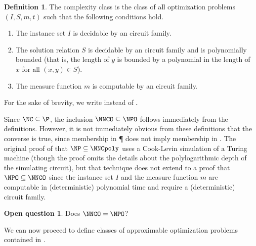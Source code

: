 \documentclass[]{article}
\theoremstyle{definition} \newtheorem{definition}{Definition}
\theoremstyle{definition} \newtheorem{openquestion}{Open question}
\begin{document}
\begin{definition}\label{def:nnco}
  The complexity class \NNCOpoly{} is the class of all optimization problems $(I, S, m, t)$ such that the following conditions hold.
  \begin{enumerate}
  \item The instance set $I$ is decidable by an \NC{} circuit family.
  \item The solution relation $S$ is decidable by an \NC{} circuit family and is polynomially bounded (that is, the length of $y$ is bounded by a polynomial in the length of $x$ for all $(x, y)\in S$).
  \item The measure function $m$ is computable by an \FNC{} circuit family.
  \end{enumerate}
  For the sake of brevity, we write \NNCO{} instead of \NNCOpoly{}.
\end{definition}

Since $\NC\subseteq\P$, the inclusion $\NNCO\subseteq\NPO$ follows immediately from the definitions.
However, it is not immediately obvious from these definitions that the converse is true, since membership in \P{} does not imply membership in \NC.
The original proof of \cite{wolf94} that $\NP\subseteq\NNCpoly$ uses a Cook-Levin simulation of a Turing machine (though the proof omits the details about the polylogarithmic depth of the simulating circuit), but that technique does not extend to a proof that $\NPO\subseteq\NNCO$ since the instance set $I$ and the measure function $m$ are computable in (deterministic) polynomial time and require a (deterministic) \NC{} circuit family.

\begin{openquestion}
  Does $\NNCO=\NPO$?
\end{openquestion}

We can now proceed to define classes of approximable optimization problems contained in \NNCO.
\end{document}

